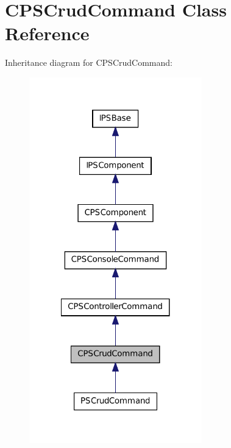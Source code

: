 \hypertarget{classCPSCrudCommand}{
\section{CPSCrudCommand Class Reference}
\label{classCPSCrudCommand}
}


Inheritance diagram for CPSCrudCommand:\nopagebreak
\begin{figure}[H]
\begin{center}
\leavevmode
\includegraphics[width=212pt]{classCPSCrudCommand__inherit__graph}
\end{center}
\end{figure}


